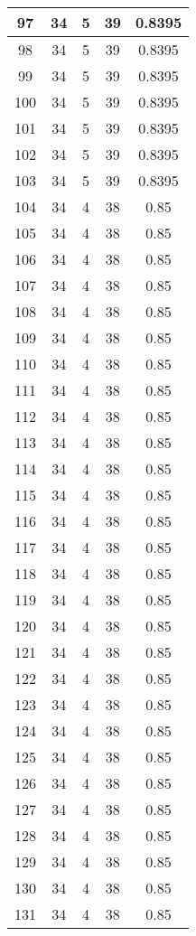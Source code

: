 \documentclass[letterpaper, 12pt]{article}
\begin{document}
\begin{longtable}{|c|c|c|c|c|}
\hline
97 & 34 & 5 & 39 & 0.8395 \\
\hline
98 & 34 & 5 & 39 & 0.8395 \\
\hline
99 & 34 & 5 & 39 & 0.8395 \\
\hline
100 & 34 & 5 & 39 & 0.8395 \\
\hline
101 & 34 & 5 & 39 & 0.8395 \\
\hline
102 & 34 & 5 & 39 & 0.8395 \\
\hline
103 & 34 & 5 & 39 & 0.8395 \\
\hline
104 & 34 & 4 & 38 & 0.85 \\
\hline
105 & 34 & 4 & 38 & 0.85 \\
\hline
106 & 34 & 4 & 38 & 0.85 \\
\hline
107 & 34 & 4 & 38 & 0.85 \\
\hline
108 & 34 & 4 & 38 & 0.85 \\
\hline
109 & 34 & 4 & 38 & 0.85 \\
\hline
110 & 34 & 4 & 38 & 0.85 \\
\hline
111 & 34 & 4 & 38 & 0.85 \\
\hline
112 & 34 & 4 & 38 & 0.85 \\
\hline
113 & 34 & 4 & 38 & 0.85 \\
\hline
114 & 34 & 4 & 38 & 0.85 \\
\hline
115 & 34 & 4 & 38 & 0.85 \\
\hline
116 & 34 & 4 & 38 & 0.85 \\
\hline
117 & 34 & 4 & 38 & 0.85 \\
\hline
118 & 34 & 4 & 38 & 0.85 \\
\hline
119 & 34 & 4 & 38 & 0.85 \\
\hline
120 & 34 & 4 & 38 & 0.85 \\
\hline
121 & 34 & 4 & 38 & 0.85 \\
\hline
122 & 34 & 4 & 38 & 0.85 \\
\hline
123 & 34 & 4 & 38 & 0.85 \\
\hline
124 & 34 & 4 & 38 & 0.85 \\
\hline
125 & 34 & 4 & 38 & 0.85 \\
\hline
126 & 34 & 4 & 38 & 0.85 \\
\hline
127 & 34 & 4 & 38 & 0.85 \\
\hline
128 & 34 & 4 & 38 & 0.85 \\
\hline
129 & 34 & 4 & 38 & 0.85 \\
\hline
130 & 34 & 4 & 38 & 0.85 \\
\hline
131 & 34 & 4 & 38 & 0.85 \\

\end{longtable}
\end{document}
